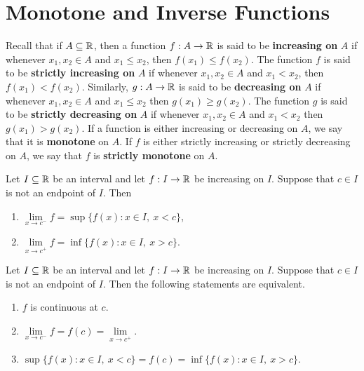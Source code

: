 \section{Monotone and Inverse Functions}

\begin{definition}
	Recall that if $A \subseteq \mathbb{R}$, then a function $f: A \to \mathbb{R}$ is said to be \textbf{increasing on} $A$ if whenever $x_1,x_2 \in A$ and $x_1 \leq x_2$, then $f(x_1) \leq f(x_2)$. The function $f$ is said to be \textbf{strictly increasing on} $A$ if whenever $x_1,x_2 \in A$ and $x_1<x_2$, then $f(x_1) < f(x_2)$. Similarly, $g:A \to \mathbb{R}$ is said to be \textbf{decreasing on} $A$ if whenever $x_1,x_2 \in A$ and $x_1 \leq x_2$ then $g(x_1) \geq g(x_2)$. The function $g$ is said to be \textbf{strictly decreasing on} $A$ if whenever $x_1, x_2 \in A$ and $x_1 < x_2$ then $g(x_1) > g(x_2)$.
	\qquad If a function is either increasing or decreasing on $A$, we say that it is \textbf{monotone} on $A$. If $f$ is either strictly increasing or strictly decreasing on $A$, we say that $f$ is \textbf{strictly monotone} on $A$.
\end{definition}

\begin{theorem}
	Let $I \subseteq \mathbb{R}$ be an interval and let $f:I \rightarrow \mathbb{R}$ be increasing on $I$. Suppose that $c \in I$ is not an endpoint of $I$. Then
	\begin{enumerate}
		\item $\lim\limits_{x\to c^-} f = \sup \{f(x): x \in I,\ x < c\}$,
		\item $\lim\limits_{x\to c^+} f = \inf \{f(x): x \in I,\ x > c\}$.
	\end{enumerate}
\end{theorem}

\begin{corollary}
	Let $I \subseteq \mathbb{R}$ be an interval and let $f:I \rightarrow \mathbb{R}$ be increasing on $I$. Suppose that $c \in I$ is not an endpoint of $I$. Then the following statements are equivalent.
	\begin{enumerate}
		\item $f$ is continuous at $c$.
		\item $\lim\limits_{x\to c^-} f = f(c) = \lim\limits_{x\to c^+}$.
		\item $\sup \{f(x):x \in I,\ x < c\} = f(c) = \inf \{f(x) : x \in I,\ x > c\}$.
	\end{enumerate}
\end{corollary}

